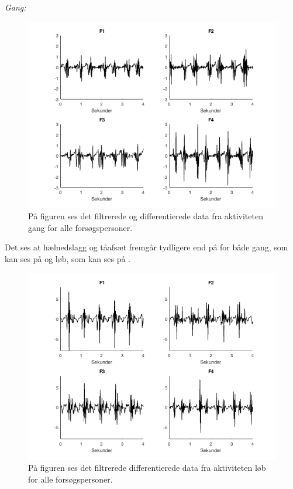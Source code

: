 \textit{Gang:}
\begin{figure}[H]
	\centering
	\includegraphics[scale=0.68]{figures/qBilag/gang_diff}
	\caption{På figuren ses det filtrerede og differentierede data fra aktiviteten gang for alle forsøgspersoner.}
	\label{fig:Ap_gangdiff}
\end{figure}

Det ses at hælnedslagg og tåafsæt fremgår tydligere end på  for både gang, som kan ses på  og løb, som kan ses på .

\begin{figure}[H]
	\centering
	\includegraphics[scale=0.68]{figures/qBilag/loeb_diff}
	\caption{På figuren ses det filtrerede differentierede data fra aktiviteten løb for alle forsøgspersoner.}
	\label{fig:Ap_loebdiff}
\end{figure}


